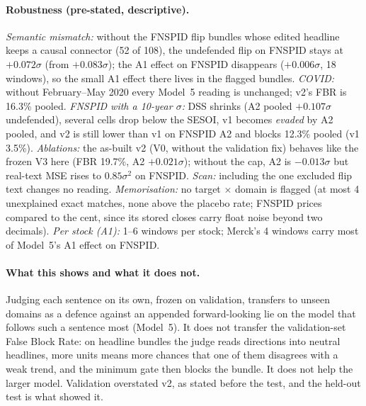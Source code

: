 \paragraph{Robustness (pre-stated, descriptive).} \emph{Semantic mismatch:} without the FNSPID flip
bundles whose edited headline keeps a causal connector (52 of 108), the undefended flip on FNSPID
stays at $+0.072\sigma$ (from $+0.083\sigma$); the A1 effect on FNSPID disappears ($+0.006\sigma$,
18 windows), so the small A1 effect there lives in the flagged bundles. \emph{COVID:} without
February--May 2020 every Model~5 reading is unchanged; v2's FBR is 16.3\% pooled. \emph{FNSPID with
a 10-year $\sigma$:} DSS shrinks (A2 pooled $+0.107\sigma$ undefended), several cells drop below
the SESOI, v1 becomes \emph{evaded} by A2 pooled, and v2 is still lower than v1 on FNSPID A2 and
blocks 12.3\% pooled (v1 3.5\%). \emph{Ablations:} the as-built v2 (V0, without the validation fix)
behaves like the frozen V3 here (FBR 19.7\%, A2 $+0.021\sigma$); without the cap, A2 is
$-0.013\sigma$ but real-text MSE rises to $0.85\sigma^2$ on FNSPID. \emph{Scan:} including the one
excluded flip text changes no reading. \emph{Memorisation:} no target $\times$ domain is flagged
(at most 4 unexplained exact matches, none above the placebo rate; FNSPID prices compared to the
cent, since its stored closes carry float noise beyond two decimals). \emph{Per stock (A1):} 1--6
windows per stock; Merck's 4 windows carry most of Model~5's A1 effect on FNSPID.

\paragraph{What this shows and what it does not.} Judging each sentence on its own, frozen on
validation, transfers to unseen domains as a defence against an appended forward-looking lie on
the model that follows such a sentence most (Model~5). It does not transfer the validation-set
False Block Rate: on headline bundles the judge reads directions into neutral headlines, more
units means more chances that one of them disagrees with a weak trend, and the minimum gate then
blocks the bundle. It does not help the larger model. Validation overstated v2, as stated before
the test, and the held-out test is what showed it.
